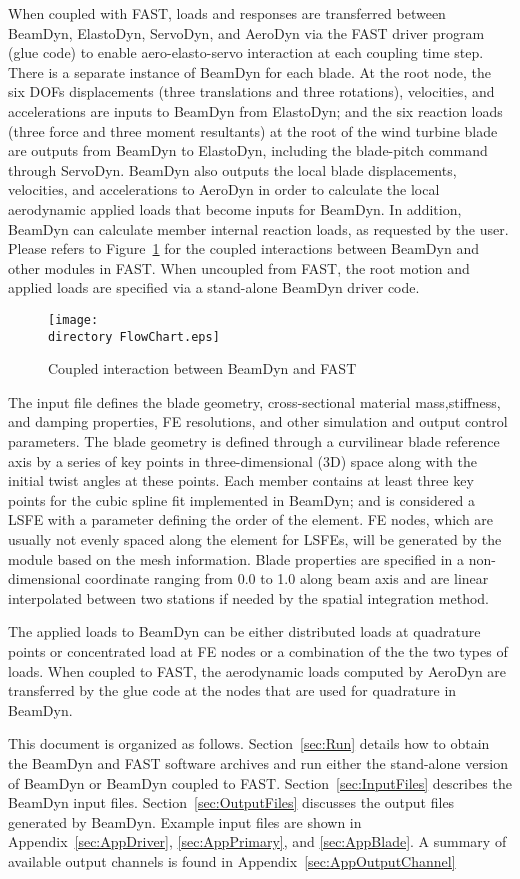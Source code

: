 When coupled with FAST, loads and responses are transferred between BeamDyn, ElastoDyn, ServoDyn, and AeroDyn via the FAST driver program (glue code) to enable aero-elasto-servo interaction at each coupling time step. There is a separate instance of BeamDyn for each blade. At the root node, the six DOFs displacements (three translations and three rotations), velocities, and accelerations are inputs to BeamDyn from ElastoDyn; and the six reaction loads (three force and three moment resultants) at the root of the wind turbine blade are outputs from BeamDyn to ElastoDyn, including the blade-pitch command through ServoDyn. BeamDyn also outputs the local blade displacements, velocities, and accelerations to AeroDyn in order to calculate the local aerodynamic applied loads that become inputs for BeamDyn. In addition, BeamDyn can calculate member internal reaction loads, as requested by the user. Please refers to Figure~\ref{fig:FlowChart} for the coupled interactions between BeamDyn and other modules in FAST. When uncoupled from FAST, the root motion and applied loads are specified via a stand-alone BeamDyn driver code.
\begin{figure}
    \centering
    \texttt{[image: \\directory FlowChart.eps]}
    \caption{Coupled interaction between BeamDyn and FAST}
    \label{fig:FlowChart}
\end{figure}

The input file defines the blade geometry, cross-sectional material mass,stiffness, and damping properties, FE resolutions, and other simulation and output control parameters. The blade geometry is defined through a curvilinear blade reference axis by a series of key points in three-dimensional (3D) space along with the initial twist angles at these points. Each member contains at least three key points for the cubic spline fit implemented in BeamDyn; and is considered a LSFE with a parameter defining the order of the element. FE nodes, which are usually not evenly spaced along the element for LSFEs, will be generated by the module based on the mesh information. Blade properties are specified in a non-dimensional coordinate ranging from 0.0 to 1.0 along beam axis and are linear interpolated between two stations if needed  by the spatial integration method. 

The applied loads to BeamDyn can be either distributed loads at quadrature points or concentrated load at FE nodes or a combination of the the two types of loads.  When coupled to FAST, the aerodynamic loads computed by AeroDyn are transferred by the glue code at the nodes that are used for quadrature in BeamDyn.

This document is organized as follows. Section~\ref{sec:Run} details how to obtain the BeamDyn and FAST software archives and run either the stand-alone version of BeamDyn or BeamDyn coupled to FAST. Section~\ref{sec:InputFiles} describes the BeamDyn input files. Section~\ref{sec:OutputFiles} discusses the output files generated by BeamDyn. Example input files are shown in Appendix~\ref{sec:AppDriver}, \ref{sec:AppPrimary}, and  \ref{sec:AppBlade}. A summary of available output channels is found in Appendix~\ref{sec:AppOutputChannel}
